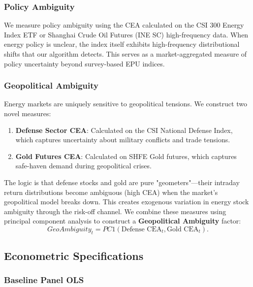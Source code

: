 \documentclass[preprint,12pt,authoryear]{elsarticle}
\begin{document}
\subsubsection{Policy Ambiguity}

We measure policy ambiguity using the CEA calculated on the CSI 300 Energy Index ETF or Shanghai Crude Oil Futures (INE SC) high-frequency data. When energy policy is unclear, the index itself exhibits high-frequency distributional shifts that our algorithm detects. This serves as a market-aggregated measure of policy uncertainty beyond survey-based EPU indices.

\subsubsection{Geopolitical Ambiguity}

Energy markets are uniquely sensitive to geopolitical tensions. We construct two novel measures:
\begin{enumerate}
\item \textbf{Defense Sector CEA}: Calculated on the CSI National Defense Index, which captures uncertainty about military conflicts and trade tensions.
\item \textbf{Gold Futures CEA}: Calculated on SHFE Gold futures, which captures safe-haven demand during geopolitical crises.
\end{enumerate}

The logic is that defense stocks and gold are pure "geometers"—their intraday return distributions become ambiguous (high CEA) when the market's geopolitical model breaks down. This creates exogenous variation in energy stock ambiguity through the risk-off channel. We combine these measures using principal component analysis to construct a \textbf{Geopolitical Ambiguity} factor:
\begin{equation}
GeoAmbiguity_t = PC1(\text{Defense CEA}_t, \text{Gold CEA}_t).
\end{equation}

\subsection{Econometric Specifications}

\subsubsection{Baseline Panel OLS}
\end{document}

